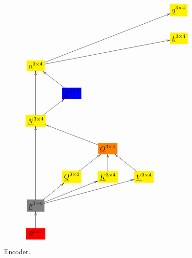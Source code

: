 \documentclass[12pt]{article}
\begin{document}
\begin{figure}[h!]\centering
$$\xymatrix{
&&&&*+[F*:yellow]{\underline{q}^{3\times  4}}
\\
&&&&*+[F*:yellow]{\underline{k}^{3\times  4}}
\\
*+[F*:yellow]{\underline{n}^{3\times  4}}\ar[uurrrr]\ar[urrrr]&&&&
\\
&*+[F*:blue]{\underline{F}^{3\times  4}}\ar[ul]&&&
\\
*+[F*:yellow]{\underline{N}^{3\times  4}}\ar[uu]\ar[ur]&&&&
\\
&&*+[F*:orange]{\underline{O}^{3\times  4}}\ar[ull]&&
\\
&*+[F*:yellow]{\underline{Q}^{3\times  4}}\ar[ur]&*+[F*:yellow]{\underline{K}^{3\times  4}}\ar[u]&*+[F*:yellow]{\underline{V}^{3\times  4}}\ar[ul]&
\\
*+[F*:gray]{\underline{p}^{3\times  4}}\ar[uuu]\ar[ur]\ar[urr]\ar[urrr]&&&&
\\
*+[F*:red]{\underline{R}^{3\times  4}}\ar[u]&&&&
}$$
\caption{Encoder.}
\label{fig-texnn-for-transformer-encoder}
\end{figure}
\end{document}
